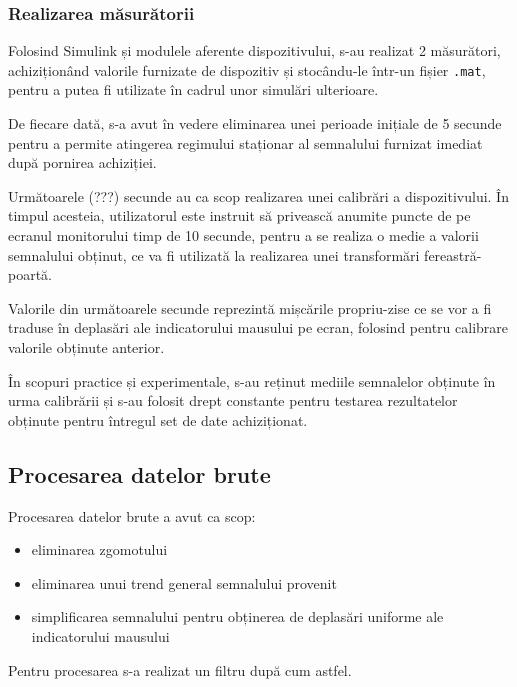 \documentclass[12pt]{article}
\begin{document}
\begin{multicols}{2}
	\subsubsection*{Realizarea măsurătorii}
	Folosind Simulink și modulele aferente dispozitivului, s-au realizat 2 măsurători, achiziționând valorile furnizate de dispozitiv și stocându-le într-un fișier  {\tt.mat}, pentru a putea fi utilizate în cadrul unor simulări ulterioare.
	
	De fiecare dată, s-a avut în vedere eliminarea unei perioade inițiale de 5 secunde pentru a permite atingerea regimului staționar al semnalului furnizat imediat după pornirea achiziției.
	
	Următoarele (???) secunde au ca scop realizarea unei calibrări a dispozitivului. În timpul acesteia, utilizatorul este instruit să privească anumite puncte de pe ecranul monitorului timp de 10 secunde, pentru a se realiza o medie a valorii semnalului obținut, ce va fi utilizată la realizarea unei transformări fereastră-poartă.
	
	Valorile din următoarele secunde reprezintă mișcările propriu-zise ce se vor a fi traduse în deplasări ale indicatorului mausului pe ecran, folosind pentru calibrare valorile obținute anterior.
	
	În scopuri practice și experimentale, s-au reținut mediile semnalelor obținute în urma calibrării și s-au folosit drept constante pentru testarea rezultatelor obținute pentru întregul set de date achiziționat.
	
	\subsection* {Procesarea datelor brute}
	Procesarea datelor brute a avut ca scop:
	\begin{itemize}[noitemsep,nolistsep]
		\item eliminarea zgomotului
		\item eliminarea unui trend general semnalului provenit
		\item simplificarea semnalului pentru obținerea de deplasări uniforme ale indicatorului mausului
	\end{itemize}
	
	Pentru procesarea s-a realizat un filtru după cum astfel. 
	
	\end{multicols}
	
\end{document}

